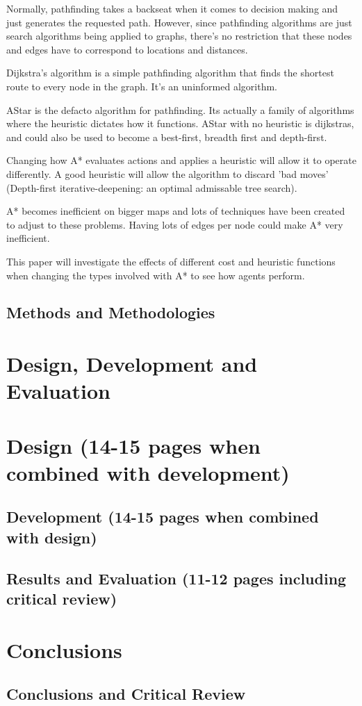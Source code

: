 \documentclass[10pt]{article}
\begin{document}
Normally, pathfinding takes a backseat when it comes to decision making and just generates the requested path. However, since pathfinding algorithms are just search algorithms being applied to graphs, there's no restriction that these nodes and edges have to correspond to locations and distances.

Dijkstra's algorithm is a simple pathfinding algorithm that finds the shortest route to every node in the graph. It's an uninformed algorithm.

AStar is the defacto algorithm for pathfinding. Its actually a family of algorithms where the heuristic dictates how it functions. AStar with no heuristic is dijkstras, and could also be used to become a best-first, breadth first and depth-first.

Changing how A* evaluates actions and applies a heuristic will allow it to operate differently. A good heuristic will allow the algorithm to discard 'bad moves' (Depth-first iterative-deepening: an optimal admissable tree search).

A* becomes inefficient on bigger maps and lots of techniques have been created to adjust to these problems. Having lots of edges per node could make A* very inefficient.

This paper will investigate the effects of different cost and heuristic functions when changing the types involved with A* to see how agents perform.

\subsection{Methods and Methodologies}

\section {Design, Development and Evaluation}

\section{Design (14-15 pages when combined with development)}

\subsection {Development (14-15 pages when combined with design)}

\subsection {Results and Evaluation (11-12 pages including critical review)}

\section {Conclusions}

\subsection {Conclusions and Critical Review}

\printbibliography
\end{document}
